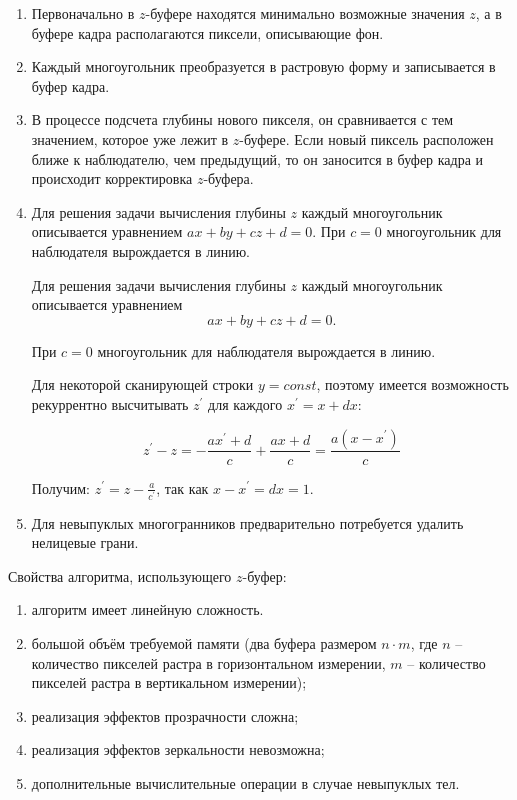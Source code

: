 \begin{enumerate}[label=\arabic*)]
	\item  Первоначально в $z$-буфере находятся минимально возможные значения $z$, а в буфере кадра располагаются пиксели, описывающие фон. 
	\item Каждый многоугольник преобразуется в растровую форму и записывается в буфер кадра.
	\item В процессе подсчета глубины нового пикселя, он сравнивается с тем значением, которое уже лежит в $z$-буфере. Если новый пиксель расположен ближе к наблюдателю, чем предыдущий, то он заносится в буфер кадра и происходит корректировка $z$-буфера.
	\item  Для решения задачи вычисления глубины $z$ каждый многоугольник описывается уравнением $ax + by + cz + d = 0$. При $c = 0$ многоугольник для наблюдателя вырождается в линию. 
	
	Для решения задачи вычисления глубины $z$ каждый многоугольник описывается уравнением 
	\begin{equation}
			ax + by + cz + d = 0.
	\end{equation}

	При $c = 0$ многоугольник для наблюдателя вырождается в линию. 
	
	Для некоторой сканирующей строки $y = const$, поэтому имеется возможность рекуррентно высчитывать $z^\prime$ для каждого $x^\prime = x + dx$:
	
	\begin{equation}
		z^\prime - z = -\frac{ax^\prime + d}{c} +\frac{ax + d}{c} = \frac{a(x - x^\prime)}{c}
	\end{equation}

Получим: $z^\prime = z - \frac{a}{c^\prime}$, так как $x - x^\prime = dx = 1$.

	\item Для невыпуклых многогранников предварительно потребуется удалить нелицевые грани.
\end{enumerate}

Свойства алгоритма, использующего $z$-буфер:
\begin{enumerate}[label=\arabic*)]
	\item алгоритм имеет линейную сложность.
	\item большой объём требуемой памяти (два буфера размером $n \cdot m$, где $n$ -- количество пикселей растра в горизонтальном измерении, $m$ -- количество пикселей растра в вертикальном измерении);
	\item реализация эффектов прозрачности сложна;
	\item реализация эффектов зеркальности невозможна;
	\item дополнительные вычислительные операции в случае невыпуклых тел.
\end{enumerate}

